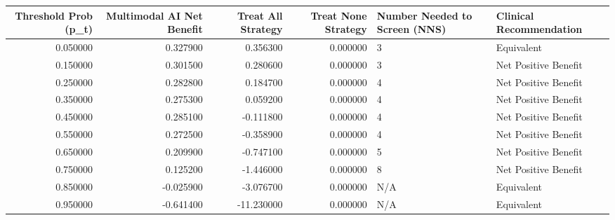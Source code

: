 \begin{tabular}{rrrrll}
\toprule
Threshold Prob (p\_t) & Multimodal AI Net Benefit & Treat All Strategy & Treat None Strategy & Number Needed to Screen (NNS) & Clinical Recommendation \\
\midrule
0.050000 & 0.327900 & 0.356300 & 0.000000 & 3 & Equivalent \\
0.150000 & 0.301500 & 0.280600 & 0.000000 & 3 & Net Positive Benefit \\
0.250000 & 0.282800 & 0.184700 & 0.000000 & 4 & Net Positive Benefit \\
0.350000 & 0.275300 & 0.059200 & 0.000000 & 4 & Net Positive Benefit \\
0.450000 & 0.285100 & -0.111800 & 0.000000 & 4 & Net Positive Benefit \\
0.550000 & 0.272500 & -0.358900 & 0.000000 & 4 & Net Positive Benefit \\
0.650000 & 0.209900 & -0.747100 & 0.000000 & 5 & Net Positive Benefit \\
0.750000 & 0.125200 & -1.446000 & 0.000000 & 8 & Net Positive Benefit \\
0.850000 & -0.025900 & -3.076700 & 0.000000 & N/A & Equivalent \\
0.950000 & -0.641400 & -11.230000 & 0.000000 & N/A & Equivalent \\
\bottomrule
\end{tabular}
